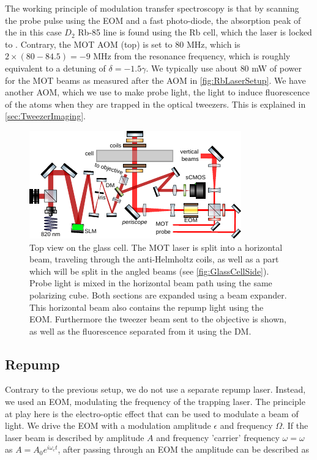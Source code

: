 The working principle of modulation transfer spectroscopy is that by scanning the probe pulse using the \ac{EOM} and a fast photo-diode, the absorption peak of the in this case $D_2$ Rb-85 line is found using the Rb cell, which the laser is locked to \cite{Reijnders2010,McCarron2008}.  
Contrary, the MOT AOM (top) is set to 80 MHz, which is $2 \times (80 - 84.5) = -9$ MHz from the resonance frequency, which is roughly equivalent to a detuning of $\delta = -1.5 \gamma$.
We typically use about $80$ mW of power for the MOT beams as measured after the \ac{AOM} in \cref{fig:RbLaserSetup}.
We have another AOM, which we use to make probe light, the light to induce fluorescence of the atoms when they are trapped in the optical tweezers.
This is explained in \cref{sec:TweezerImaging}.

\begin{figure}[t]
    \centering
    \includegraphics[width=\textwidth]{figures/MOTupview.pdf}
    \caption{
    Top view on the glass cell.
    The MOT laser is split into a horizontal beam, traveling through the anti-Helmholtz coils, as well as a part which will be split in the angled beams (see \cref{fig:GlassCellSide}). 
    Probe light is mixed in the horizontal beam path using the same polarizing cube. 
    Both sections are expanded using a beam expander.
    This horizontal beam also contains the repump light using the \ac{EOM}.
    Furthermore the tweezer beam sent to the objective is shown, as well as the fluorescence separated from it using the \acf{DM}.
    }
    \label{fig:GlassCellTop}
\end{figure}

\subsection{Repump}\label{sec:Repump}

Contrary to the previous setup, we do not use a separate repump laser. 
Instead, we used an \ac{EOM}, modulating the frequency of the trapping laser. 
The principle at play here is the electro-optic effect that can be used to modulate a beam of light. 
We drive the EOM with a modulation amplitude $\epsilon$ and frequency $\Omega$.
If the laser beam is described by amplitude $A$ and frequency 'carrier' frequency $\omega = \omega$ as $A = A_0 e^{i \omega_c t}$, after passing through an EOM the amplitude can be described as

